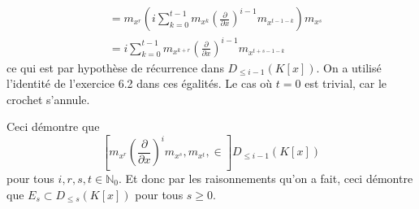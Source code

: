 \documentclass[french]{article}
\newcommand{\mdx}[1]{\left(\frac{\partial}{\partial x}\right)^{#1}}
\newcommand{\DK}[1]{D_{\leq #1} (K[x])}
\newcommand{\N}{\mathbb{N}}
\newcommand{\lie}[2]{\left[#1, #2\right]}
\begin{document}
\begin{enumerate}
\begin{itemize}
\begin{align*}
				&= m_{x^r}\left(
					i\sum_{k=0}^{t - 1}m_{x^k}\mdx{i-1}m_{x^{t - 1 - k}}
				\right)m_{x^s}\\
				&= i\sum_{k=0}^{t - 1}m_{x^{k + r}}\mdx{i-1}m_{x^{t + s - 1 - k}}
			\end{align*}
			ce qui est par hypothèse de récurrence dans $\DK{i - 1}$.
			On a utilisé l'identité de l'exercice 6.2 dans ces égalités.
			Le cas où $t = 0$ est trivial, car le crochet s'annule.
		\end{itemize}
		Ceci démontre que 
		\begin{equation*}
			\lie{m_{x^r}\mdx{i}m_{x^s}, m_{x^t}} \in \DK{i-1}
		\end{equation*}
		pour tous $i, r, s, t \in \N_0$.
		Et donc par les raisonnements qu'on a fait, ceci démontre que $E_s \subset
		\DK{s}$ pour tous $s\geq 0$.


\end{enumerate}
\end{document}
